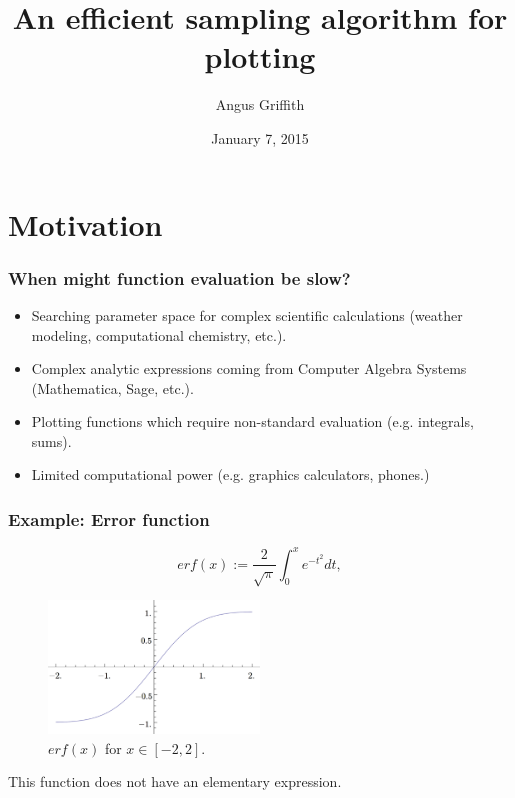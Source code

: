 \documentclass{beamer}
\title{An efficient sampling algorithm for plotting}
\author{Angus Griffith}
\date{January 7, 2015}
\begin{document}
\begin{frame}
\titlepage
\end{frame}

\section{Motivation}
\begin{frame}
\frametitle{When might function evaluation be slow?}
\begin{itemize}
\item
Searching parameter space for complex scientific calculations (weather modeling, computational chemistry, etc.).
\item
Complex analytic expressions coming from Computer Algebra Systems (Mathematica, Sage, etc.).
\item
Plotting functions which require non-standard evaluation (e.g. integrals, sums).
\item
Limited computational power (e.g. graphics calculators, phones.)
\end{itemize}
\end{frame}

\begin{frame}
\frametitle{Example: Error function}
\[
erf(x) := \frac{2}{\sqrt{\pi}} \int_0^x e^{-t^2} dt,
\]
\begin{figure}
\includegraphics[width=0.5\textwidth]{erfx.png}
\caption{$erf(x)$ for $x \in [-2, 2]$.}
\end{figure}
This function does not have an elementary expression.
\end{frame}
\end{document}
